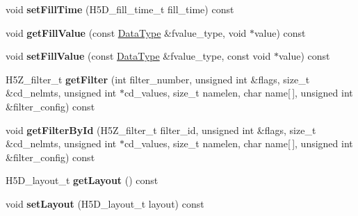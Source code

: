 \begin{DoxyCompactItemize}
\mbox{\label{class_h5_1_1_d_set_creat_prop_list_a084923c077a3ef60b78808df5a1f6391}} 
void {\bfseries set\+Fill\+Time} (H5\+D\+\_\+fill\+\_\+time\+\_\+t fill\+\_\+time) const
\item 
\mbox{\label{class_h5_1_1_d_set_creat_prop_list_a89fae7f23682c7ebbd47e75a2e7ee8dc}} 
void {\bfseries get\+Fill\+Value} (const \hyperlink{class_h5_1_1_data_type}{Data\+Type} \&fvalue\+\_\+type, void $\ast$value) const
\item 
\mbox{\label{class_h5_1_1_d_set_creat_prop_list_ad477b0730376b8aabd47adbed0100933}} 
void {\bfseries set\+Fill\+Value} (const \hyperlink{class_h5_1_1_data_type}{Data\+Type} \&fvalue\+\_\+type, const void $\ast$value) const
\item 
\mbox{\label{class_h5_1_1_d_set_creat_prop_list_af6d8744d98f251f7a8f94df64f2405ef}} 
H5\+Z\+\_\+filter\+\_\+t {\bfseries get\+Filter} (int filter\+\_\+number, unsigned int \&flags, size\+\_\+t \&cd\+\_\+nelmts, unsigned int $\ast$cd\+\_\+values, size\+\_\+t namelen, char name\mbox{[}$\,$\mbox{]}, unsigned int \&filter\+\_\+config) const
\item 
\mbox{\label{class_h5_1_1_d_set_creat_prop_list_abb6f29fbcfbc70aef28f96e1962ac778}} 
void {\bfseries get\+Filter\+By\+Id} (H5\+Z\+\_\+filter\+\_\+t filter\+\_\+id, unsigned int \&flags, size\+\_\+t \&cd\+\_\+nelmts, unsigned int $\ast$cd\+\_\+values, size\+\_\+t namelen, char name\mbox{[}$\,$\mbox{]}, unsigned int \&filter\+\_\+config) const
\item 
\mbox{\label{class_h5_1_1_d_set_creat_prop_list_a17a333e1cc6dabbf2c71c80758fa8bbc}} 
H5\+D\+\_\+layout\+\_\+t {\bfseries get\+Layout} () const
\item 
\mbox{\label{class_h5_1_1_d_set_creat_prop_list_aa3648a39bc43389187e1a372999a77d5}} 
void {\bfseries set\+Layout} (H5\+D\+\_\+layout\+\_\+t layout) const
\item 
\mbox{\label{class_h5_1_1_d_set_creat_prop_list_ada589ef31aee1e6e0c60c4ac1bbf0d4b}} 

\end{DoxyCompactItemize}
